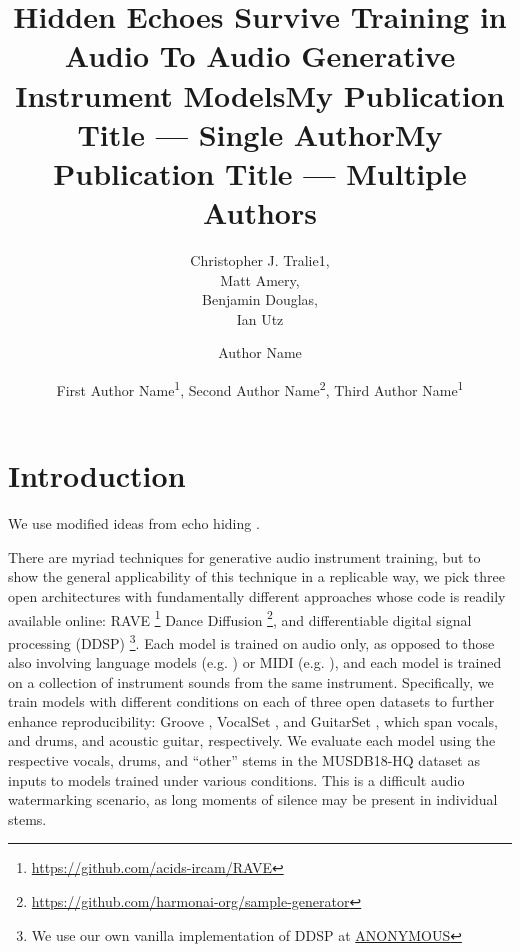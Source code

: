 \documentclass[letterpaper]{article} %
\title{Hidden Echoes Survive Training in Audio To Audio Generative Instrument Models}
\author{
    Christopher J. Tralie{\rm 1},\\
    Matt Amery,\\
    Benjamin Douglas,\\
    Ian Utz
}
\title{My Publication Title --- Single Author}
\author {
    Author Name
}
\title{My Publication Title --- Multiple Authors}
\author {
    First Author Name\textsuperscript{\rm 1},
    Second Author Name\textsuperscript{\rm 2},
    Third Author Name\textsuperscript{\rm 1}
}
\begin{document}
\maketitle

\begin{abstract}

\end{abstract}

%

\section{Introduction}

We use modified ideas from echo hiding \cite{gruhl1996echo}.

There are myriad techniques for generative audio instrument training, but to show the general applicability of this technique in a replicable way, we pick three open architectures with fundamentally different approaches whose code is readily available online: RAVE \cite{caillon2021rave}\footnote{ \url{https://github.com/acids-ircam/RAVE} } Dance Diffusion \cite{evans2022dancediffusion} \footnote{ \url{https://github.com/harmonai-org/sample-generator} }, and differentiable digital signal processing (DDSP) \cite{engelddsp}\footnote{We use our own vanilla implementation of DDSP at \url{ANONYMOUS}}.  Each model is trained on audio only, as opposed to those also involving language models (e.g. \cite{evans2024fast}) or MIDI (e.g. \cite{hawthornemulti}), and each model is trained on a collection of instrument sounds from the same instrument.  Specifically, we train models with different conditions on each of three open datasets to further enhance reproducibility: Groove \cite{groove2019}, VocalSet \cite{wilkins2018vocalset}, and GuitarSet \cite{xi2018guitarset}, which span vocals, and drums, and acoustic guitar, respectively.  We evaluate each model using the respective vocals, drums, and ``other'' stems in the MUSDB18-HQ dataset \cite{musdb18-hq} as inputs to models trained under various conditions.  This is a difficult audio watermarking scenario, as long moments of silence may be present in individual stems.
\end{document}
